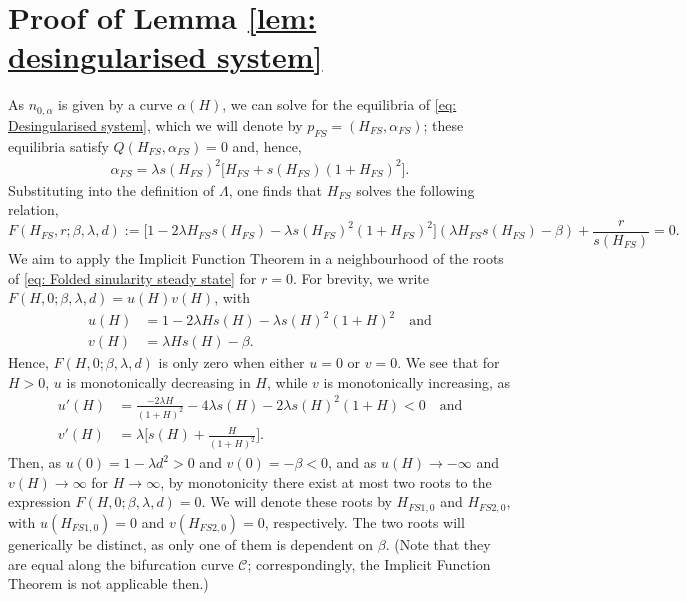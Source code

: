 \documentclass{article}
\theoremstyle{definition}
\numberwithin{equation}{section}
\begin{document}
\section{Proof of Lemma \ref{lem: desingularised system}}
\label{sec: desingularised system proof}
As $n_{0,\alpha}$ is given by a curve $\alpha(H)$, we can solve for the equilibria of \eqref{eq: Desingularised system}, which we will denote by $p_{FS}=(H_{FS},\alpha_{FS})$; these equilibria satisfy $Q(H_{FS},\alpha_{FS})=0$ and, hence,
\begin{align}
    \alpha_{FS} = \lambda s(H_{FS})^2\big[H_{FS}+s(H_{FS})(1+H_{FS})^2\big].
    \label{eq: alpha FS equation}
\end{align}
Substituting into the definition of $\Lambda$, one finds that $H_{FS}$ solves the following relation,
\begin{equation}
    F(H_{FS},r;\beta,\lambda,d):=\big[1-2\lambda H_{FS}s(H_{FS})-\lambda s(H_{FS})^2(1+H_{FS})^2\big](\lambda H_{FS}s(H_{FS})-\beta)+\frac{r}{s(H_{FS})} = 0.
    \label{eq: Folded sinularity steady state}
\end{equation}
We aim to apply the Implicit Function Theorem in a neighbourhood of the roots of \eqref{eq: Folded sinularity steady state} for $r=0$. For brevity, we write $F(H,0;\beta,\lambda,d) = u(H)v(H)$, with 
\begin{align*}
    u(H) &= 1-2\lambda Hs(H)-\lambda s(H)^2(1+H)^2\quad\text{and} \\
    v(H) &= \lambda H s(H)-\beta.
\end{align*}
Hence, $F(H,0;\beta,\lambda,d)$ is only zero when either $u=0$ or $v=0$. We see that for $H>0$, $u$ is monotonically decreasing in $H$, while $v$ is monotonically increasing, as
\begin{align*}
    u'(H) &= \frac{-2\lambda H}{(1+H)^2}-4\lambda s(H)-2\lambda s(H)^2(1+H)<0\quad\text{and} \\
    v'(H) &= \lambda\bigg[s(H)+\frac{H}{(1+H)^2}\bigg].
\end{align*}
Then, as $u(0)=1-\lambda d^2>0$ and $v(0)=-\beta<0$, and as $u(H)\to -\infty$ and $v(H)\to\infty$ for $H\to\infty$, by monotonicity there exist at most two roots to the expression $F(H,0;\beta,\lambda,d)=0$. We will denote these roots by $H_{FS1,0}$ and $H_{FS2,0}$, with $u(H_{FS1,0})=0$ and $v(H_{FS2,0})=0$, respectively. The two roots will generically be distinct, as only one of them is dependent on $\beta$. (Note that they are equal along the bifurcation curve $\mathcal{C}$; correspondingly, the Implicit Function Theorem is not applicable then.)
\end{document}
